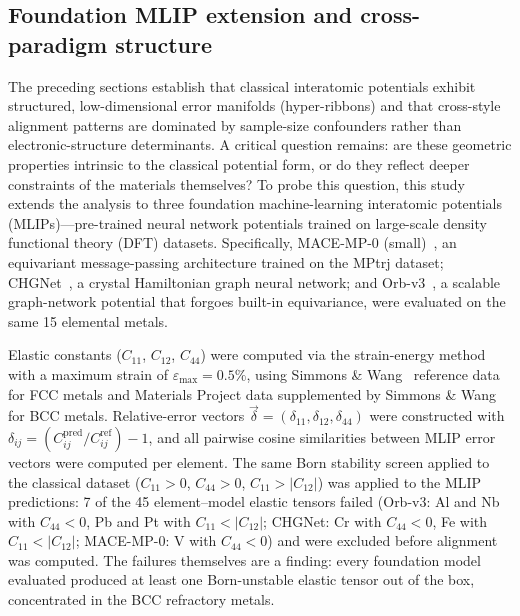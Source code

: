\documentclass[twocolumn,10pt]{article}
\begin{document}
\subsection{Foundation MLIP extension and cross-paradigm structure}
\label{subsec:foundation_mlip}

The preceding sections establish that classical interatomic potentials exhibit structured, low-dimensional error manifolds (hyper-ribbons) and that cross-style alignment patterns are dominated by sample-size confounders rather than electronic-structure determinants. A critical question remains: are these geometric properties intrinsic to the classical potential form, or do they reflect deeper constraints of the materials themselves? To probe this question, this study extends the analysis to three foundation machine-learning interatomic potentials (MLIPs)---pre-trained neural network potentials trained on large-scale density functional theory (DFT) datasets. Specifically, MACE-MP-0 (small)~\cite{batatia2024}, an equivariant message-passing architecture trained on the MPtrj dataset; CHGNet~\cite{deng2023}, a crystal Hamiltonian graph neural network; and Orb-v3~\cite{rhodes2025}, a scalable graph-network potential that forgoes built-in equivariance, were evaluated on the same 15 elemental metals.

Elastic constants ($C_{11}$, $C_{12}$, $C_{44}$) were computed via the strain-energy method with a maximum strain of $\varepsilon_{\max} = 0.5\%$, using Simmons \& Wang~\cite{simmons1971} reference data for FCC metals and Materials Project data supplemented by Simmons \& Wang for BCC metals. Relative-error vectors $\vec{\delta} = (\delta_{11}, \delta_{12}, \delta_{44})$ were constructed with $\delta_{ij} = (C_{ij}^{\text{pred}} / C_{ij}^{\text{ref}}) - 1$, and all pairwise cosine similarities between MLIP error vectors were computed per element. The same Born stability screen applied to the classical dataset ($C_{11}>0$, $C_{44}>0$, $C_{11}>|C_{12}|$) was applied to the MLIP predictions: 7 of the 45 element--model elastic tensors failed (Orb-v3: Al and Nb with $C_{44}<0$, Pb and Pt with $C_{11}<|C_{12}|$; CHGNet: Cr with $C_{44}<0$, Fe with $C_{11}<|C_{12}|$; MACE-MP-0: V with $C_{44}<0$) and were excluded before alignment was computed. The failures themselves are a finding: every foundation model evaluated produced at least one Born-unstable elastic tensor out of the box, concentrated in the BCC refractory metals.
\end{document}

